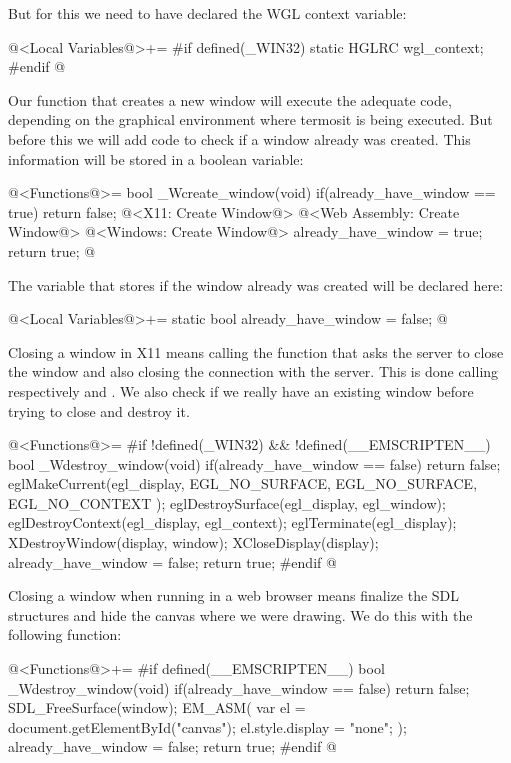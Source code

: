 But for this we need to have declared the WGL context variable:

@<Local Variables@>+=
#if defined(_WIN32)
static HGLRC wgl_context;
#endif
@
\fimcodigo


Our function that creates a new window will execute the adequate code,
depending on the graphical environment where termosit is being
executed. But before this we will add code to check if a window
already was created. This information will be stored in a boolean
variable:

\iniciocodigo
@<Functions@>=
bool _Wcreate_window(void){
  if(already_have_window == true)
    return false;
  @<X11: Create Window@>
  @<Web Assembly: Create Window@>
  @<Windows: Create Window@>
  already_have_window = true;
  return true;
}
@
\fimcodigo

The variable that stores if the window already was created will be
declared here:

\iniciocodigo
@<Local Variables@>+=
static bool already_have_window = false;
@
\fimcodigo



Closing a window in X11 means calling the function that asks the
server to close the window and also closing the connection with the
server. This is done calling respectively 
and . We also check if we really have an
existing window before trying to close and destroy it.

\iniciocodigo
@<Functions@>=
#if !defined(_WIN32) && !defined(__EMSCRIPTEN__)
bool _Wdestroy_window(void){
  if(already_have_window == false)
    return false;
  eglMakeCurrent(egl_display, EGL_NO_SURFACE, EGL_NO_SURFACE,
                 EGL_NO_CONTEXT );
  eglDestroySurface(egl_display, egl_window);
  eglDestroyContext(egl_display, egl_context);
  eglTerminate(egl_display);
  XDestroyWindow(display, window);
  XCloseDisplay(display);
  already_have_window = false;
  return true;
}
#endif
@
\fimcodigo


Closing a window when running in a web browser means finalize the SDL
structures and hide the canvas where we were drawing. We do this with
the following function:

\iniciocodigo
@<Functions@>+=
#if defined(__EMSCRIPTEN__)
bool _Wdestroy_window(void){
  if(already_have_window == false)
    return false;
  SDL_FreeSurface(window);
  EM_ASM(
    var el = document.getElementById("canvas");
    el.style.display = "none";
  );
  already_have_window = false;
  return true;
}
#endif
@
\fimcodigo

